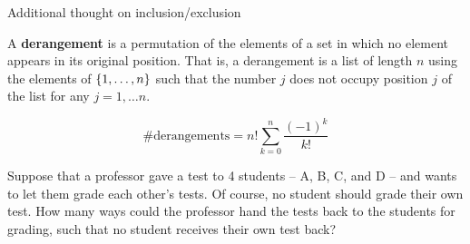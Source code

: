\documentclass[10pt]{beamer}
\begin{document}
\begin{frame}[standout]
Additional thought on inclusion/exclusion
\end{frame}

\begin{frame}
\footnotesize 
\begin{myredbox}[title=Definition]
A \textbf{derangement} is a permutation of the elements of a set in which no element appears in its original position.	 That is, a derangement is a list of length $n$ using the elements of $\{ {1,\hdots, n} \}$ such that the number $j$ does not occupy position $j$ of the list for any $j=1,\hdots n$.
\end{myredbox}
\vfill 
\begin{mygreenbox}[title=\text{Proposition (Scheinerman pp.114)}]
\[\# \text{derangements} = n! \sum_{k=0}^n \frac{(-1)^k}{k!} \]
\end{mygreenbox}
\vfill 
\begin{myyellowbox}[title=Poll]
Suppose that a professor gave a test to 4 students – A, B, C, and D – and wants to let them grade each other's tests. Of course, no student should grade their own test. How many ways could the professor hand the tests back to the students for grading, such that no student receives their own test back?
\end{myyellowbox}
	
	
\end{frame}
\end{document}
